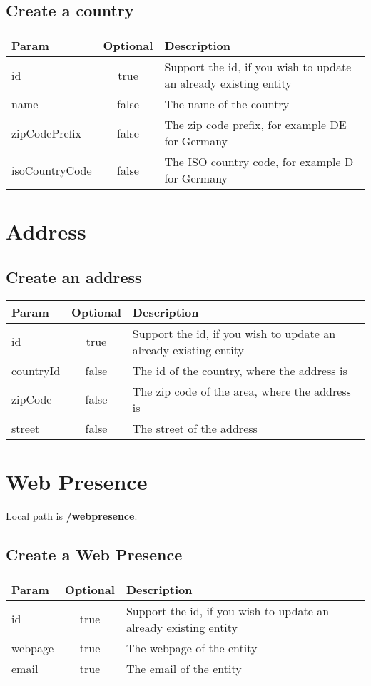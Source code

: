 \documentclass[a4paper,10pt]{book}
\newcommand{\thead}[1]{\textbf{\large{#1}}}
\begin{document}
\subsection{Create a country}
\label{s:ccountry}

\begin{tabular}{l | c | l}
\thead{Param} & \thead{Optional} & \thead{Description}\\
\hline
id & true & Support the id, if you wish to update an already existing entity\\
name & false & The name of the country \\
zipCodePrefix & false & The zip code prefix, for example DE for Germany \\
isoCountryCode & false & The ISO country code, for example D for Germany
 
\end{tabular} 

\section{Address}
\label{sec:address}

\subsection{Create an address}
\label{s:caddress}

\begin{tabular}{l | c | l}
\thead{Param} & \thead{Optional} & \thead{Description}\\
\hline
id & true & Support the id, if you wish to update an already existing entity\\
countryId & false & The id of the country, where the address is\\
zipCode & false & The zip code of the area, where the address is \\
street & false & The street of the address \\
 
\end{tabular} 


\section{Web Presence}
\label{sec:WebPresence}

Local path is \textbf{/webpresence}.

\subsection{Create a Web Presence}
\label{s:cWebPresence}

\begin{tabular}{l | c | l}
\thead{Param} & \thead{Optional} & \thead{Description}\\
\hline
id & true & Support the id, if you wish to update an already existing entity\\
webpage & true & The webpage of the entity\\
email & true & The email of the entity \\
 
\end{tabular} 
\end{document}
